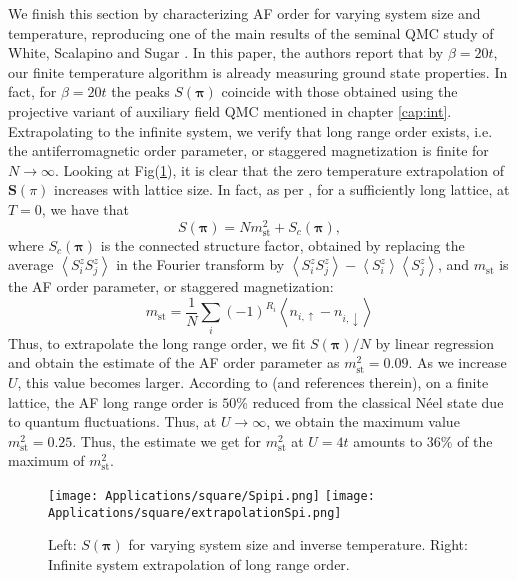 We finish this section by characterizing \ac{AF} order for varying system size and temperature, reproducing one of the main results of the seminal \ac{QMC} study of White, Scalapino and Sugar \cite{white_numerical_1989}.
In this paper, the authors report that by $\beta = 20 t$, our finite temperature algorithm is already measuring ground state properties.
In fact, for $\beta = 20 t$ the peaks $S ( \bm \pi )$ coincide with those obtained using the projective variant of auxiliary field \ac{QMC} mentioned in chapter \ref{cap:int}.
Extrapolating to the infinite system, we verify that long range order exists, i.e. the antiferromagnetic order parameter, or staggered magnetization is finite for $N \rightarrow \infty$.
Looking at Fig(\ref{fig:spipi}), it is clear that the zero temperature extrapolation of $\bm S (\pi)$ increases with lattice size.
In fact, as per \cite{hirsch_two-dimensional_1985}, for a sufficiently long lattice, at $T= 0$, we have that
\begin{equation}
S(\bm \pi) = N m_{\text{st}}^2 + S_c ( \bm \pi ) ,
\end{equation}
where $S_c ( \bm \pi )$ is the connected structure factor, obtained by replacing the average $\left\langle S^z_i S^z_j \right\rangle$ in the Fourier transform by $\left\langle S^z_i S^z_j \right\rangle - \left\langle S^z_i \right\rangle \left\langle S^z_j \right\rangle$, and $m_{\text{st}}$ is the \ac{AF} order parameter, or staggered magnetization:
\begin{equation}
m_{\text{st}} = \frac{1}{N} \sum_i (-1)^{R_i} \left\langle n_{i,\uparrow} - n_{i,\downarrow} \right\rangle
\end{equation}
Thus, to extrapolate the long range order, we fit $S ( \bm \pi ) / N$ by linear regression and obtain the estimate of the \ac{AF} order parameter as $m_{\text{st}}^2 = 0.09$.
As we increase $U$, this value becomes larger.
According to \cite{hirsch_two-dimensional_1985} (and references therein), on a finite lattice, the \ac{AF} long range order is $50 \%$ reduced from the classical Néel state due to quantum fluctuations.
Thus, at $U \rightarrow \infty$, we obtain the maximum value $m_{\text{st}}^2 = 0.25$.
Thus, the estimate we get for $m_{\text{st}}^2$  at $U=4t$ amounts to $36\%$ of the maximum of $m_{\text{st}}^2$.
\vspace{-0.3cm}
\begin{figure}[H]
\texttt{[image: Applications/square/Spipi.png]}
\hspace{0.3cm}
\texttt{[image: Applications/square/extrapolationSpi.png]}
\caption[$S ( \bm \pi ) $ for varying system size and inverse temperature.
Infinite system extrapolation of long range order.]{Left: $S ( \bm \pi ) $ for varying system size and inverse temperature.
Right: Infinite system extrapolation of long range order. \label{fig:spipi} }
\end{figure}